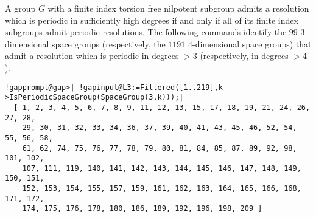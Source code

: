 \documentclass[a4paper,11pt]{report}
\begin{document}
{{ A group $G$ with a finite index torsion free nilpotent subgroup admits a resolution which
is periodic in sufficiently high degrees if and only if all of its finite
index subgroups admit periodic resolutions. The following commands identify
the $99$ $3$-dimensional space groups (respectively, the $1191$ $4$-dimensional space groups) that admit a resolution which is periodic in
degrees $> 3$ (respectively, in degrees $> 4$). 
\begin{Verbatim}[commandchars=!@|,fontsize=\small,frame=single,label=Example]
  !gapprompt@gap>| !gapinput@L3:=Filtered([1..219],k->IsPeriodicSpaceGroup(SpaceGroup(3,k)));|
  [ 1, 2, 3, 4, 5, 6, 7, 8, 9, 11, 12, 13, 15, 17, 18, 19, 21, 24, 26, 27, 28, 
    29, 30, 31, 32, 33, 34, 36, 37, 39, 40, 41, 43, 45, 46, 52, 54, 55, 56, 58, 
    61, 62, 74, 75, 76, 77, 78, 79, 80, 81, 84, 85, 87, 89, 92, 98, 101, 102, 
    107, 111, 119, 140, 141, 142, 143, 144, 145, 146, 147, 148, 149, 150, 151, 
    152, 153, 154, 155, 157, 159, 161, 162, 163, 164, 165, 166, 168, 171, 172, 
    174, 175, 176, 178, 180, 186, 189, 192, 196, 198, 209 ] 
  

\end{Verbatim}}}
\end{document}
